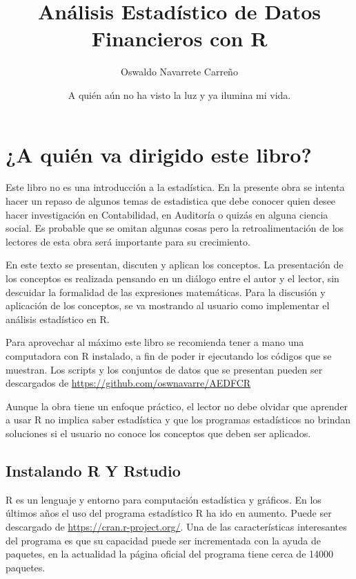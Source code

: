 \documentclass[]{book}
\title{Análisis Estadístico de Datos Financieros con R}
\author{Oswaldo Navarrete Carreño}
\date{A quién aún no ha visto la luz y ya ilumina mi vida.}
\begin{document}
\maketitle

{
\setcounter{tocdepth}{1}
\tableofcontents
}
\hypertarget{a-quien-va-dirigido-este-libro}{%
\chapter{¿A quién va dirigido este libro?}\label{a-quien-va-dirigido-este-libro}}

Este libro no es una introducción a la estadística. En la presente obra se intenta hacer un repaso de algunos temas de estadistica que debe conocer quien desee hacer investigación en Contabilidad, en Auditoría o quizás en alguna ciencia social. Es probable que se omitan algunas cosas pero la retroalimentación de los lectores de esta obra será importante para su crecimiento.

En este texto se presentan, discuten y aplican los conceptos. La presentación de los conceptos es realizada pensando en un diálogo entre el autor y el lector, sin descuidar la formalidad de las expresiones matemáticas. Para la discusión y aplicación de los conceptos, se va mostrando al usuario como implementar el análisis estadístico en R.

Para aprovechar al máximo este libro se recomienda tener a mano una computadora con R instalado, a fin de poder ir ejecutando los códigos que se muestran. Los scripts y los conjuntos de datos que se presentan pueden ser descargados de \url{https://github.com/oswnavarre/AEDFCR}

Aunque la obra tiene un enfoque práctico, el lector no debe olvidar que aprender a usar R no implica saber estadística y que los programas estadísticos no brindan soluciones si el usuario no conoce los conceptos que deben ser aplicados.

\hypertarget{instalando-r-y-rstudio}{%
\section{Instalando R Y Rstudio}\label{instalando-r-y-rstudio}}

R es un lenguaje y entorno para computación estadística y gráficos. En los últimos años el uso del programa estadístico R ha ido en aumento. Puede ser descargado de \url{https://cran.r-project.org/}. Una de las características interesantes del programa es que su capacidad puede ser incrementada con la ayuda de paquetes, en la actualidad la página oficial del programa tiene cerca de 14000 paquetes.
\end{document}
